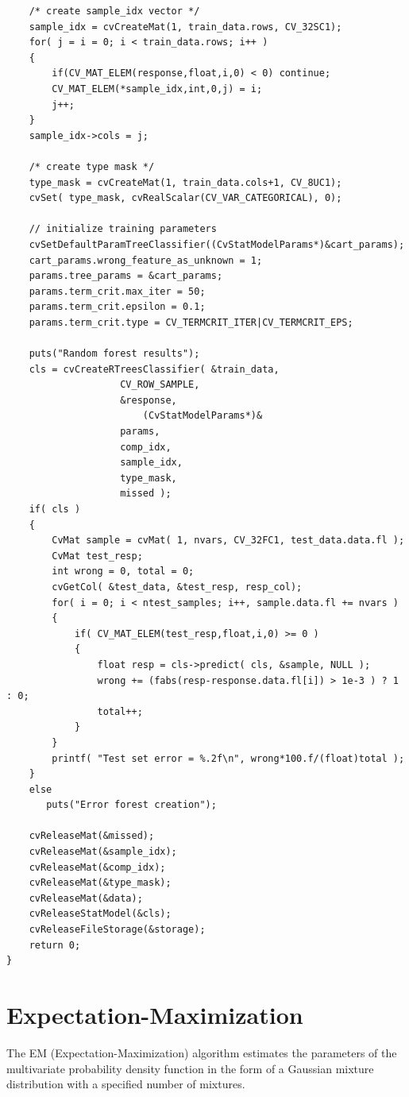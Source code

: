 \begin{lstlisting}
    /* create sample_idx vector */
    sample_idx = cvCreateMat(1, train_data.rows, CV_32SC1);
    for( j = i = 0; i < train_data.rows; i++ )
    {
        if(CV_MAT_ELEM(response,float,i,0) < 0) continue;
        CV_MAT_ELEM(*sample_idx,int,0,j) = i;
        j++;
    }
    sample_idx->cols = j;

    /* create type mask */
    type_mask = cvCreateMat(1, train_data.cols+1, CV_8UC1);
    cvSet( type_mask, cvRealScalar(CV_VAR_CATEGORICAL), 0);

    // initialize training parameters
    cvSetDefaultParamTreeClassifier((CvStatModelParams*)&cart_params);
    cart_params.wrong_feature_as_unknown = 1;
    params.tree_params = &cart_params;
    params.term_crit.max_iter = 50;
    params.term_crit.epsilon = 0.1;
    params.term_crit.type = CV_TERMCRIT_ITER|CV_TERMCRIT_EPS;

    puts("Random forest results");
    cls = cvCreateRTreesClassifier( &train_data, 
				    CV_ROW_SAMPLE, 
				    &response,
        			    (CvStatModelParams*)& 
				    params, 
				    comp_idx, 
				    sample_idx, 
				    type_mask, 
				    missed );
    if( cls )
    {
        CvMat sample = cvMat( 1, nvars, CV_32FC1, test_data.data.fl );
        CvMat test_resp;
        int wrong = 0, total = 0;
        cvGetCol( &test_data, &test_resp, resp_col);
        for( i = 0; i < ntest_samples; i++, sample.data.fl += nvars )
        {
            if( CV_MAT_ELEM(test_resp,float,i,0) >= 0 )
            {
                float resp = cls->predict( cls, &sample, NULL );
                wrong += (fabs(resp-response.data.fl[i]) > 1e-3 ) ? 1 : 0;
                total++;
            }
        }
        printf( "Test set error = %.2f\n", wrong*100.f/(float)total );
    }
    else
       puts("Error forest creation");

    cvReleaseMat(&missed);
    cvReleaseMat(&sample_idx);
    cvReleaseMat(&comp_idx);
    cvReleaseMat(&type_mask);
    cvReleaseMat(&data);
    cvReleaseStatModel(&cls);
    cvReleaseFileStorage(&storage);
    return 0;
}
\end{lstlisting}

\section{Expectation-Maximization}

The EM (Expectation-Maximization) algorithm estimates the parameters of the multivariate probability density function in the form of a Gaussian mixture distribution with a specified number of mixtures.

